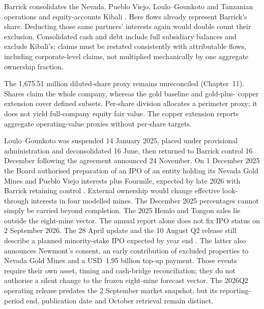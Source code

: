 Barrick consolidates the Nevada, Pueblo Viejo, Loulo--Gounkoto and Tanzanian
operations and equity-accounts Kibali \cite{barrick-ar-2025}. Here flows
already represent Barrick's share. Deducting those same partners' interests
again would double count their exclusion. Consolidated cash and debt include
full subsidiary balances and exclude Kibali's; claims must be restated
consistently with attributable flows, including corporate-level claims,
not multiplied mechanically by one aggregate ownership fraction.

The 1,675.51 million diluted-share proxy remains unreconciled (Chapter~11).
Shares claim the whole company, whereas the gold baseline and gold-plus-
copper extension cover defined subsets. Per-share division allocates a
perimeter proxy; it does not yield full-company equity fair value. The copper
extension reports aggregate operating-value proxies without per-share targets.

Loulo--Gounkoto was suspended 14 January 2025, placed under provisional
administration and deconsolidated 16 June, then returned to Barrick control
16 December following the agreement announced 24 November. On 1 December
2025 the Board authorised preparation of an IPO of an entity holding its
Nevada Gold Mines and Pueblo Viejo interests plus Fourmile, expected by late
2026 with Barrick retaining control \cite{barrick-ar-2025}. External ownership
would change effective look-through interests in four modelled mines. The
December 2025 percentages cannot simply be carried beyond completion.
The 2025 Hemlo and Tongon sales lie outside the eight-mine vector.
The annual report alone does not fix IPO status on 2 September 2026.
The 28 April update and the 10 August Q2 release still describe a planned
minority-stake IPO expected by year end \cite{barrick-ipo-2026,barrick-q2-release-2026}.
The latter also announces Newmont's consent, an early contribution of excluded
properties to Nevada Gold Mines and a USD~1.95 billion top-up payment. Those
events require their own asset, timing and cash-bridge reconciliation; they
do not authorise a silent change to the frozen eight-mine forecast vector.
The 2026Q2 operating release predates the 2 September market snapshot, but its
reporting-period end, publication date and October retrieval remain distinct.



